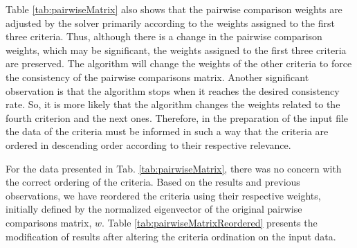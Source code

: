 \documentclass[10pt,fleqn,a4paper,twoside]{article}
\begin{document}
Table \ref{tab:pairwiseMatrix} also shows that the pairwise comparison weights are adjusted by the solver primarily according to the weights assigned to the first three criteria. Thus, although there is a change in the pairwise comparison weights, which may be significant, the weights assigned to the first three criteria are preserved. The algorithm will change the weights of the other criteria to force the consistency of the pairwise comparisons matrix. Another significant observation is that the algorithm stops when it reaches the desired consistency rate. So, it is more likely that the algorithm changes the weights related to the fourth criterion and the next ones. Therefore, in the preparation of the input file the data of the criteria must be informed in such a way that the criteria are ordered in descending order according to their respective relevance.

For the data presented in Tab. \ref{tab:pairwiseMatrix}, there was no concern with the correct ordering of the criteria. Based on the results and previous observations, we have reordered the criteria using their respective weights, initially defined by the normalized eigenvector of the original pairwise comparisons matrix, $w$. Table \ref{tab:pairwiseMatrixReordered} presents the modification of results after altering the criteria ordination on the input data.
\end{document}
